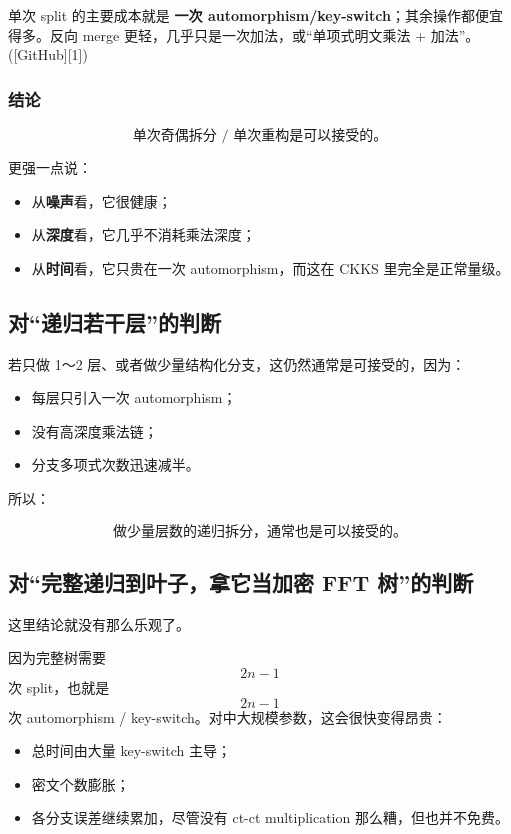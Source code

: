 \documentclass{article}
\begin{document}
单次 split 的主要成本就是 \textbf{一次 automorphism/key-switch}；其余操作都便宜得多。反向 merge 更轻，几乎只是一次加法，或“单项式明文乘法 + 加法”。([GitHub][1])

\subsubsection{结论}

\[
\boxed{
\text{单次奇偶拆分 / 单次重构是可以接受的。}
}
\]

更强一点说：

\begin{itemize}
    \item 从\textbf{噪声}看，它很健康；
    \item 从\textbf{深度}看，它几乎不消耗乘法深度；
    \item 从\textbf{时间}看，它只贵在一次 automorphism，而这在 CKKS 里完全是正常量级。
\end{itemize}

\subsection{对“递归若干层”的判断}

若只做 1～2 层、或者做少量结构化分支，这仍然通常是可接受的，因为：

\begin{itemize}
    \item 每层只引入一次 automorphism；
    \item 没有高深度乘法链；
    \item 分支多项式次数迅速减半。
\end{itemize}

所以：

\[
\boxed{
\text{做少量层数的递归拆分，通常也是可以接受的。}
}
\]

\subsection{对“完整递归到叶子，拿它当加密 FFT 树”的判断}

这里结论就没有那么乐观了。

因为完整树需要
\[
2n-1
\]
次 split，也就是
\[
2n-1
\]
次 automorphism / key-switch。对中大规模参数，这会很快变得昂贵：

\begin{itemize}
    \item 总时间由大量 key-switch 主导；
    \item 密文个数膨胀；
    \item 各分支误差继续累加，尽管没有 ct-ct multiplication 那么糟，但也并不免费。
\end{itemize}
\end{document}
